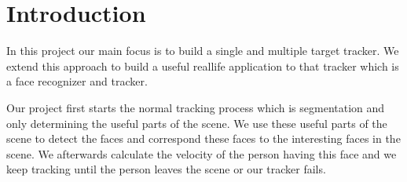 \section{Introduction}
In this project our main focus is to build a single and multiple target tracker. We extend this approach to build a useful reallife application to that tracker which is a face recognizer and tracker.

Our project first starts the normal tracking process which is segmentation and only determining the useful parts of the scene. We use these useful parts of the scene to detect the faces and correspond these faces to the interesting faces in the scene. We afterwards calculate the velocity of the person having this face and we keep tracking until the person leaves the scene or our tracker fails.